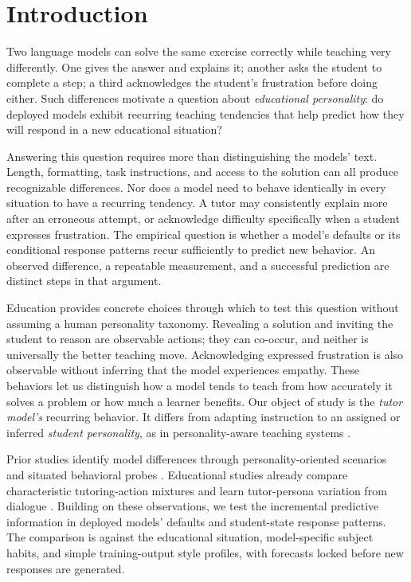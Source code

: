 \section{Introduction}

Two language models can solve the same exercise correctly while teaching very
differently. One gives the answer and explains it; another asks the student to
complete a step; a third acknowledges the student's frustration before doing
either. Such differences motivate a question about \emph{educational
personality}: do deployed models exhibit recurring teaching tendencies that help
predict how they will respond in a new educational situation?

Answering this question requires more than distinguishing the models' text.
Length, formatting, task instructions, and access to the solution can all produce
recognizable differences. Nor does a model need to behave identically in every
situation to have a recurring tendency. A tutor may consistently explain more
after an erroneous attempt, or acknowledge difficulty specifically when a student
expresses frustration. The empirical question is whether a model's defaults or
its conditional response patterns recur sufficiently to predict new behavior.
An observed difference, a repeatable measurement, and a successful prediction
are distinct steps in that argument.

Education provides concrete choices through which to test this question without
assuming a human personality taxonomy. Revealing a solution and inviting the
student to reason are observable actions; they can co-occur, and neither is
universally the better teaching move. Acknowledging expressed frustration is
also observable without inferring that the model experiences empathy. These
behaviors let us distinguish how a model tends to teach from how accurately it
solves a problem or how much a learner benefits. Our object of study is the
\emph{tutor model's} recurring behavior. It differs from adapting instruction to
an assigned or inferred \emph{student personality}, as in personality-aware
teaching systems \citep{rooein2026pats}.

Prior studies identify model differences through personality-oriented
scenarios and situated behavioral probes \citep{lee2025trait,liu2026bma}.
Educational studies already compare characteristic tutoring-action mixtures
and learn tutor-persona variation from dialogue
\citep{kucheria2025cima,lee2026tutorpersonas}. Building on these observations,
we test the incremental predictive information in deployed models' defaults
and student-state response patterns. The comparison is against the educational
situation, model-specific subject habits, and simple training-output style
profiles, with forecasts locked before new responses are generated.

